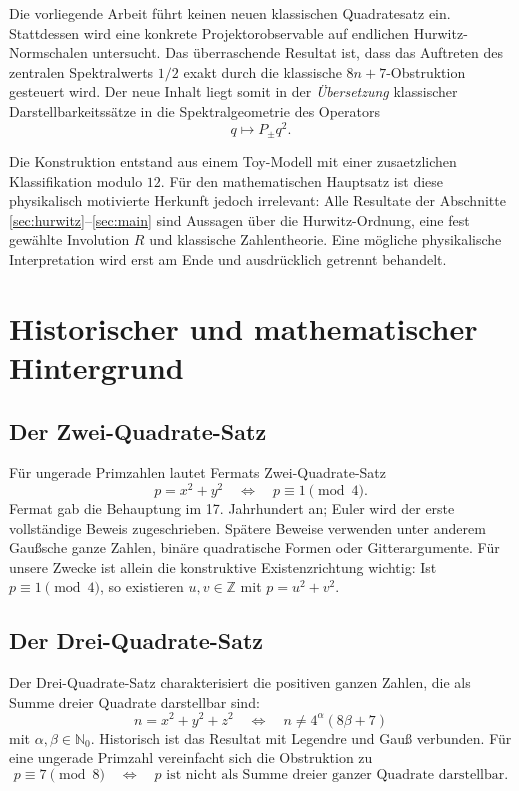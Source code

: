 \documentclass[11pt,a4paper]{article}
\theoremstyle{definition}
\newcommand{\NN}{\mathbb N}
\newcommand{\ZZ}{\mathbb Z}
\begin{document}
Die vorliegende Arbeit führt keinen neuen klassischen Quadratesatz ein. Stattdessen wird eine konkrete Projektorobservable auf endlichen Hurwitz-Normschalen untersucht. Das überraschende Resultat ist, dass das Auftreten des zentralen Spektralwerts $1/2$ exakt durch die klassische $8n+7$-Obstruktion gesteuert wird. Der neue Inhalt liegt somit in der \emph{Übersetzung} klassischer Darstellbarkeitssätze in die Spektralgeometrie des Operators
\[
q\longmapsto P_\pm q^2.
\]

Die Konstruktion entstand aus einem Toy-Modell mit einer zusaetzlichen Klassifikation modulo $12$. Für den mathematischen Hauptsatz ist diese physikalisch motivierte Herkunft jedoch irrelevant: Alle Resultate der Abschnitte \ref{sec:hurwitz}--\ref{sec:main} sind Aussagen über die Hurwitz-Ordnung, eine fest gewählte Involution $R$ und klassische Zahlentheorie. Eine mögliche physikalische Interpretation wird erst am Ende und ausdrücklich getrennt behandelt.

\section{Historischer und mathematischer Hintergrund}
\subsection{Der Zwei-Quadrate-Satz}
Für ungerade Primzahlen lautet Fermats Zwei-Quadrate-Satz
\begin{equation}\label{eq:2square}
p=x^2+y^2\quad\Longleftrightarrow\quad p\equiv1\pmod4.
\end{equation}
Fermat gab die Behauptung im 17. Jahrhundert an; Euler wird der erste vollständige Beweis zugeschrieben. Spätere Beweise verwenden unter anderem Gaußsche ganze Zahlen, binäre quadratische Formen oder Gitterargumente. Für unsere Zwecke ist allein die konstruktive Existenzrichtung wichtig: Ist $p\equiv1\pmod4$, so existieren $u,v\in\ZZ$ mit $p=u^2+v^2$.

\subsection{Der Drei-Quadrate-Satz}
Der Drei-Quadrate-Satz charakterisiert die positiven ganzen Zahlen, die als Summe dreier Quadrate darstellbar sind:
\begin{equation}\label{eq:3square}
n=x^2+y^2+z^2
\quad\Longleftrightarrow\quad
n\neq4^\alpha(8\beta+7)
\end{equation}
mit $\alpha,\beta\in\NN_0$. Historisch ist das Resultat mit Legendre und Gauß verbunden. Für eine ungerade Primzahl vereinfacht sich die Obstruktion zu
\begin{equation}\label{eq:prime3square}
p\equiv7\pmod8
\quad\Longleftrightarrow\quad
p\text{ ist nicht als Summe dreier ganzer Quadrate darstellbar.}
\end{equation}
\end{document}
